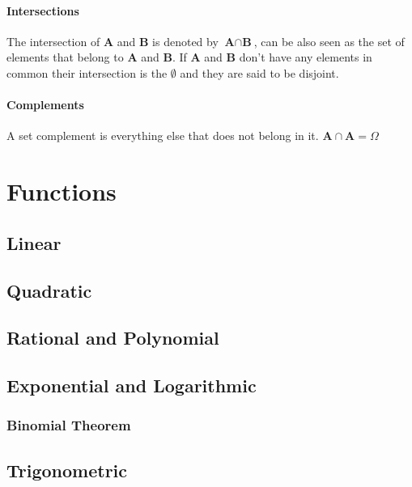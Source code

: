 \documentclass[a4paper,11pt]{book}
\begin{document}
\subsubsection{Intersections}
The intersection of \textbf{A} and \textbf{B} is denoted by $\textbf{A} \cap \textbf{B}$, can be also seen as the set of elements that belong to \textbf{A} and \textbf{B}. If \textbf{A} and \textbf{B} don't have any elements in common their intersection is the $\emptyset$ and they are said to be disjoint. 

\subsubsection{Complements}
A set complement is everything else that does not belong in it. $\textbf{A} \cap \textbf{A} = \Omega$


\chapter{Functions}
\section{Linear}

\section{Quadratic}
\section{Rational and Polynomial}
\section{Exponential and Logarithmic}
\subsection{Binomial Theorem}
\section{Trigonometric}
\end{document}
